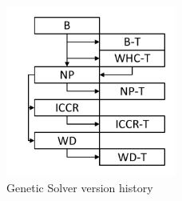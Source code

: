 \begin{figure}
	\centering
	\includegraphics[width=0.5\textwidth]{images/GSVersions.pdf}
	\caption[Genetic Solver version history]{Genetic Solver version history}
	\label{fig:GSVersions}
\end{figure} 



